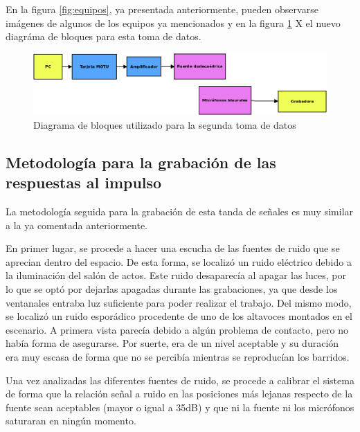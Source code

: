 \documentclass[11pt,a4paper,twoside]{book}
\begin{document}
            En la figura \ref{fig:equipos}, ya presentada anteriormente, pueden observarse imágenes de algunos de los equipos ya mencionados y en la figura \ref{fig:bloques2} X el nuevo diagráma de bloques para esta toma de datos.
            
            \begin{figure}
	            \includegraphics[scale=0.47]{../imagenes/diagrama_bloques2.png}
			    \centering
			    \caption{Diagrama de bloques utilizado para la segunda toma de datos}
			    \label{fig:bloques2}
	        \end{figure}
            
            
                
        \subsection{Metodología para la grabación de las respuestas al impulso}
            La metodología seguida para la grabación de esta tanda de señales es muy similar a la ya comentada anteriormente.
                
            En primer lugar, se procede a hacer una escucha de las fuentes de ruido que se aprecian dentro del espacio. De esta forma, se localizó un ruido eléctrico debido a la iluminación del salón de actos. Este ruido desaparecía al apagar las luces, por lo que se optó por dejarlas apagadas durante las grabaciones, ya que desde los ventanales entraba luz suficiente para poder realizar el trabajo. Del mismo modo, se localizó un ruido esporádico procedente de uno de los altavoces montados en el escenario. A primera vista parecía debido a algún problema de contacto, pero no había forma de asegurarse. Por suerte, era de un nivel aceptable y su duración era muy escasa de forma que no se percibía mientras se reproducían los barridos.
                
            Una vez analizadas las diferentes fuentes de ruido, se procede a calibrar el sistema de forma que la relación señal a ruido en las posiciones más lejanas respecto de la fuente sean aceptables (mayor o igual a 35dB) y que ni la fuente ni los micrófonos saturaran en ningún momento.
                
\end{document}
